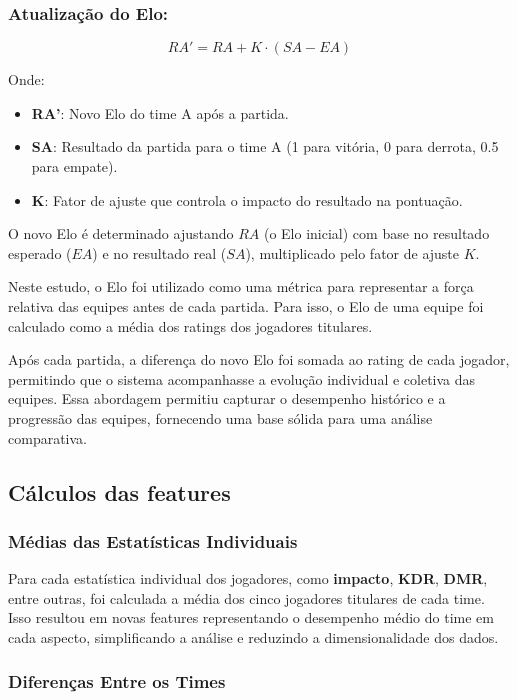\documentclass[a4paper,times,12pt]{article}
\begin{document}
\subsubsection{Atualização do Elo:}
\[
  RA' = RA + K \cdot (SA - EA)
\]

Onde:
\begin{itemize}
  \item \textbf{RA'}: Novo Elo do time A após a partida.
  \item \textbf{SA}: Resultado da partida para o time A (1 para vitória, 0 para derrota, 0.5 para empate).
  \item \textbf{K}: Fator de ajuste que controla o impacto do resultado na pontuação.
\end{itemize}

O novo Elo é determinado ajustando \( RA \) (o Elo inicial) com base no resultado esperado (\( EA \)) e no resultado real (\( SA \)), multiplicado pelo fator de ajuste \( K \).

Neste estudo, o Elo foi utilizado como uma métrica para representar a força relativa das
equipes antes de cada partida. Para isso, o Elo de uma equipe foi calculado como a média dos ratings dos jogadores titulares. 

Após cada partida, a diferença do novo Elo foi somada ao rating
de cada jogador, permitindo que o sistema acompanhasse a evolução individual e coletiva das
equipes. Essa abordagem permitiu capturar o desempenho histórico e a progressão das
equipes, fornecendo uma base sólida para uma análise comparativa.

\subsection{Cálculos das features}
\subsubsection{Médias das Estatísticas Individuais}

\hspace{+15pt}
Para cada estatística individual dos jogadores, como \textbf{impacto}, \textbf{KDR}, \textbf{DMR}, entre outras, foi calculada a média dos cinco jogadores titulares de cada time. Isso resultou em novas features representando o desempenho médio do time em cada aspecto, simplificando a análise e reduzindo a dimensionalidade dos dados.

\subsubsection{Diferenças Entre os Times}
\end{document}
